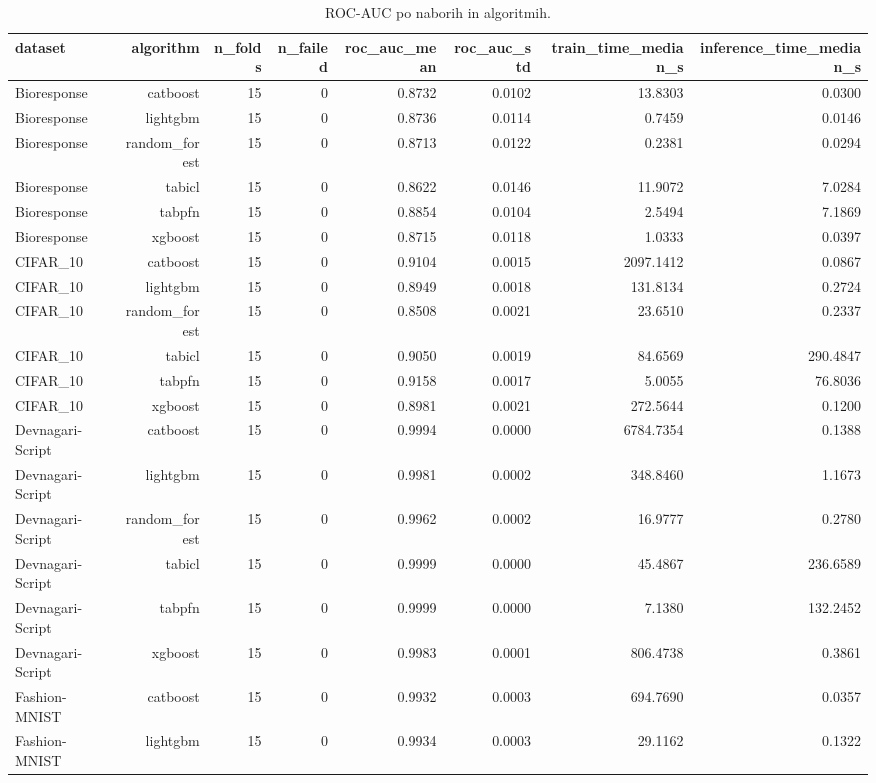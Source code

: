 \begin{table}[htbp]
\centering
\caption{ROC-AUC po naborih in algoritmih.}
\label{tab:per-dataset}
\begin{tabular}{lrrrrrrr}
\hline
dataset & algorithm & n\_folds & n\_failed & roc\_auc\_mean & roc\_auc\_std & train\_time\_median\_s & inference\_time\_median\_s \\
\hline
Bioresponse & catboost & 15 & 0 & 0.8732 & 0.0102 & 13.8303 & 0.0300 \\
Bioresponse & lightgbm & 15 & 0 & 0.8736 & 0.0114 & 0.7459 & 0.0146 \\
Bioresponse & random\_forest & 15 & 0 & 0.8713 & 0.0122 & 0.2381 & 0.0294 \\
Bioresponse & tabicl & 15 & 0 & 0.8622 & 0.0146 & 11.9072 & 7.0284 \\
Bioresponse & tabpfn & 15 & 0 & 0.8854 & 0.0104 & 2.5494 & 7.1869 \\
Bioresponse & xgboost & 15 & 0 & 0.8715 & 0.0118 & 1.0333 & 0.0397 \\
CIFAR\_10 & catboost & 15 & 0 & 0.9104 & 0.0015 & 2097.1412 & 0.0867 \\
CIFAR\_10 & lightgbm & 15 & 0 & 0.8949 & 0.0018 & 131.8134 & 0.2724 \\
CIFAR\_10 & random\_forest & 15 & 0 & 0.8508 & 0.0021 & 23.6510 & 0.2337 \\
CIFAR\_10 & tabicl & 15 & 0 & 0.9050 & 0.0019 & 84.6569 & 290.4847 \\
CIFAR\_10 & tabpfn & 15 & 0 & 0.9158 & 0.0017 & 5.0055 & 76.8036 \\
CIFAR\_10 & xgboost & 15 & 0 & 0.8981 & 0.0021 & 272.5644 & 0.1200 \\
Devnagari-Script & catboost & 15 & 0 & 0.9994 & 0.0000 & 6784.7354 & 0.1388 \\
Devnagari-Script & lightgbm & 15 & 0 & 0.9981 & 0.0002 & 348.8460 & 1.1673 \\
Devnagari-Script & random\_forest & 15 & 0 & 0.9962 & 0.0002 & 16.9777 & 0.2780 \\
Devnagari-Script & tabicl & 15 & 0 & 0.9999 & 0.0000 & 45.4867 & 236.6589 \\
Devnagari-Script & tabpfn & 15 & 0 & 0.9999 & 0.0000 & 7.1380 & 132.2452 \\
Devnagari-Script & xgboost & 15 & 0 & 0.9983 & 0.0001 & 806.4738 & 0.3861 \\
Fashion-MNIST & catboost & 15 & 0 & 0.9932 & 0.0003 & 694.7690 & 0.0357 \\
Fashion-MNIST & lightgbm & 15 & 0 & 0.9934 & 0.0003 & 29.1162 & 0.1322 \\

\end{tabular}
\end{table}
